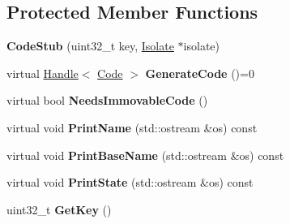 \subsection*{Protected Member Functions}
\begin{DoxyCompactItemize}
\item 
{\bfseries Code\+Stub} (uint32\+\_\+t key, \hyperlink{classv8_1_1internal_1_1_isolate}{Isolate} $\ast$isolate)\hypertarget{classv8_1_1internal_1_1_b_a_s_e___e_m_b_e_d_d_e_d_ad1068e00aba8a1879884365fa7c2f786}{}\label{classv8_1_1internal_1_1_b_a_s_e___e_m_b_e_d_d_e_d_ad1068e00aba8a1879884365fa7c2f786}

\item 
virtual \hyperlink{classv8_1_1internal_1_1_handle}{Handle}$<$ \hyperlink{classv8_1_1internal_1_1_code}{Code} $>$ {\bfseries Generate\+Code} ()=0\hypertarget{classv8_1_1internal_1_1_b_a_s_e___e_m_b_e_d_d_e_d_a89caecede3f9b0d7434144312f6a2a09}{}\label{classv8_1_1internal_1_1_b_a_s_e___e_m_b_e_d_d_e_d_a89caecede3f9b0d7434144312f6a2a09}

\item 
virtual bool {\bfseries Needs\+Immovable\+Code} ()\hypertarget{classv8_1_1internal_1_1_b_a_s_e___e_m_b_e_d_d_e_d_a3c3686f4a2d41be120a764872d2f7e49}{}\label{classv8_1_1internal_1_1_b_a_s_e___e_m_b_e_d_d_e_d_a3c3686f4a2d41be120a764872d2f7e49}

\item 
virtual void {\bfseries Print\+Name} (std\+::ostream \&os) const \hypertarget{classv8_1_1internal_1_1_b_a_s_e___e_m_b_e_d_d_e_d_a70c8e60488dd53781c8e95bdde033ad2}{}\label{classv8_1_1internal_1_1_b_a_s_e___e_m_b_e_d_d_e_d_a70c8e60488dd53781c8e95bdde033ad2}

\item 
virtual void {\bfseries Print\+Base\+Name} (std\+::ostream \&os) const \hypertarget{classv8_1_1internal_1_1_b_a_s_e___e_m_b_e_d_d_e_d_a012e611a8f267992d833f56d11a06562}{}\label{classv8_1_1internal_1_1_b_a_s_e___e_m_b_e_d_d_e_d_a012e611a8f267992d833f56d11a06562}

\item 
virtual void {\bfseries Print\+State} (std\+::ostream \&os) const \hypertarget{classv8_1_1internal_1_1_b_a_s_e___e_m_b_e_d_d_e_d_abca317212b706b4cd7d74285032de018}{}\label{classv8_1_1internal_1_1_b_a_s_e___e_m_b_e_d_d_e_d_abca317212b706b4cd7d74285032de018}

\item 
uint32\+\_\+t {\bfseries Get\+Key} ()\hypertarget{classv8_1_1internal_1_1_b_a_s_e___e_m_b_e_d_d_e_d_aad40499295cb9dabc262239098144b63}{}\label{classv8_1_1internal_1_1_b_a_s_e___e_m_b_e_d_d_e_d_aad40499295cb9dabc262239098144b63}


\end{DoxyCompactItemize}
